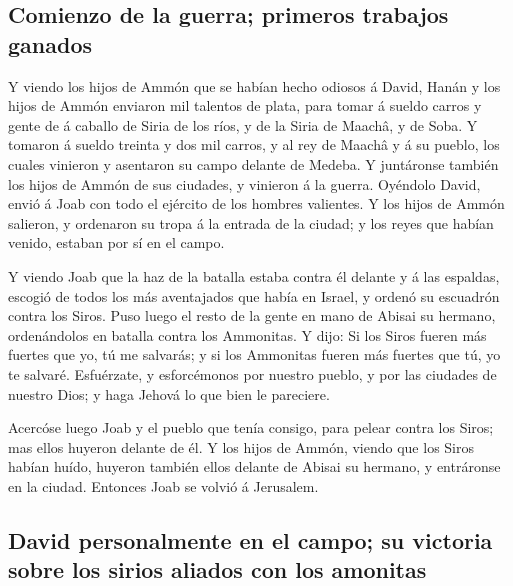 \hypertarget{comienzo-de-la-guerra-primeros-trabajos-ganados}{%
\subsection{Comienzo de la guerra; primeros trabajos
ganados}\label{comienzo-de-la-guerra-primeros-trabajos-ganados}}

 Y viendo los hijos de Ammón que se habían hecho odiosos á
David, Hanán y los hijos de Ammón enviaron mil talentos de plata, para
tomar á sueldo carros y gente de á caballo de Siria de los ríos, y de la
Siria de Maachâ, y de Soba.  Y tomaron á sueldo treinta y
dos mil carros, y al rey de Maachâ y á su pueblo, los cuales vinieron y
asentaron su campo delante de Medeba. Y juntáronse también los hijos de
Ammón de sus ciudades, y vinieron á la guerra.  Oyéndolo
David, envió á Joab con todo el ejército de los hombres valientes.
 Y los hijos de Ammón salieron, y ordenaron su tropa á la
entrada de la ciudad; y los reyes que habían venido, estaban por sí en
el campo.

 Y viendo Joab que la haz de la batalla estaba contra él
delante y á las espaldas, escogió de todos los más aventajados que había
en Israel, y ordenó su escuadrón contra los Siros.  Puso
luego el resto de la gente en mano de Abisai su hermano, ordenándolos en
batalla contra los Ammonitas.  Y dijo: Si los Siros
fueren más fuertes que yo, tú me salvarás; y si los Ammonitas fueren más
fuertes que tú, yo te salvaré.  Esfuérzate, y
esforcémonos por nuestro pueblo, y por las ciudades de nuestro Dios; y
haga Jehová lo que bien le pareciere.

 Acercóse luego Joab y el pueblo que tenía consigo, para
pelear contra los Siros; mas ellos huyeron delante de él.
 Y los hijos de Ammón, viendo que los Siros habían huído,
huyeron también ellos delante de Abisai su hermano, y entráronse en la
ciudad. Entonces Joab se volvió á Jerusalem.

\hypertarget{david-personalmente-en-el-campo-su-victoria-sobre-los-sirios-aliados-con-los-amonitas}{%
\subsection{David personalmente en el campo; su victoria sobre los
sirios aliados con los
amonitas}\label{david-personalmente-en-el-campo-su-victoria-sobre-los-sirios-aliados-con-los-amonitas}}

